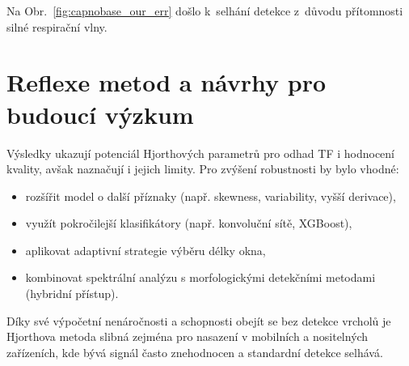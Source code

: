 Na Obr.~\ref{fig:capnobase_our_err} došlo k~selhání detekce z~důvodu přítomnosti silné respirační vlny.


\section{Reflexe metod a návrhy pro budoucí výzkum}


Výsledky ukazují potenciál Hjorthových parametrů pro odhad TF i hodnocení kvality, avšak naznačují i jejich limity. Pro zvýšení robustnosti by bylo vhodné:
\begin{itemize}
	\item rozšířit model o další příznaky (např. skewness, variability, vyšší derivace),
	\item využít pokročilejší klasifikátory (např. konvoluční sítě, XGBoost),
	\item aplikovat adaptivní strategie výběru délky okna,
	\item kombinovat spektrální analýzu s morfologickými detekčními metodami (hybridní přístup).
\end{itemize}

Díky své výpočetní nenáročnosti a schopnosti obejít se bez detekce vrcholů je Hjorthova metoda slibná zejména pro nasazení v mobilních a nositelných zařízeních, kde bývá signál často znehodnocen a standardní detekce selhává.

